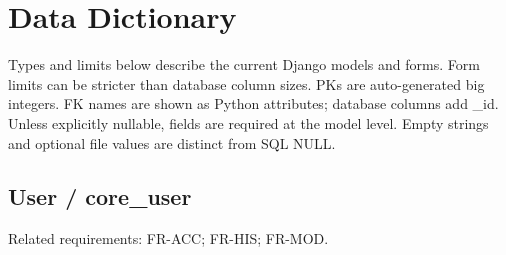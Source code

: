 \documentclass[12pt,a4paper,oneside]{report}
\begin{document}
\appendix\renewcommand{\chaptername}{Appendix}

\chapter{Data Dictionary}

Types and limits below describe the current Django models and forms. Form limits can be stricter than database column sizes. PKs are auto-generated big integers. FK names are shown as Python attributes; database columns add \_id. Unless explicitly nullable, fields are required at the model level. Empty strings and optional file values are distinct from SQL NULL.


\section{User / core\_user}

Related requirements: FR-ACC; FR-HIS; FR-MOD.
\end{document}
